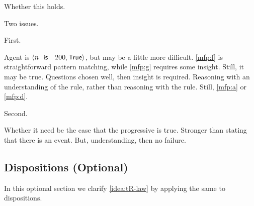 \begin{note}
  Whether this holds.

  Two issues.

  First.

  Agent is \(\pv{n\propI{ is }200}{\valI{True}}\), but  may be a little more difficult.
  \ref{mfp:f} is straightforward pattern matching, while \ref{mfp:g} requires some insight.
  Still, it may be true.
  Questions chosen well, then insight is required.
  Reasoning with an understanding of the rule, rather than reasoning with the rule.
  Still, \ref{mfp:a} or \ref{mfp:d}.

  Second.

  Whether it need be the case that the progressive is true.
  Stronger than stating that there is an event.
  But, understanding, then no failure.
\end{note}

\subsection[Dispositions]{Dispositions \hfill (Optional)}
\label{sec:dispositions}

\begin{note}
  In this optional section we clarify \autoref{idea:tR-law} by applying the same to dispositions.
\end{note}


